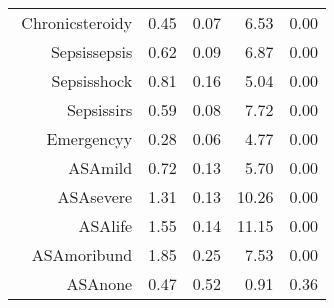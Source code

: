 \begin{tabular}{rrrrr}
$$  Chronic\-steroid\-y & 0.45 & 0.07 & 6.53 & 0.00 \\ 
  Sepsis\-sepsis & 0.62 & 0.09 & 6.87 & 0.00 \\ 
  Sepsis\-shock & 0.81 & 0.16 & 5.04 & 0.00 \\ 
  Sepsis\-sirs & 0.59 & 0.08 & 7.72 & 0.00 \\ 
  Emergency\-y & 0.28 & 0.06 & 4.77 & 0.00 \\ 
  ASA\-mild & 0.72 & 0.13 & 5.70 & 0.00 \\ 
  ASA\-severe & 1.31 & 0.13 & 10.26 & 0.00 \\ 
  ASA\-life & 1.55 & 0.14 & 11.15 & 0.00 \\ 
  ASA\-moribund & 1.85 & 0.25 & 7.53 & 0.00 \\ 
  ASA\-none & 0.47 & 0.52 & 0.91 & 0.36 \\ 
   \hline
\end{tabular}

